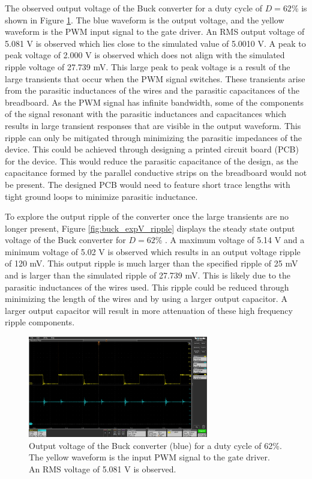 \documentclass[12pt,twoside]{scrartcl}
\begin{document}
\noindent The observed output voltage of the Buck converter for a duty cycle of $D = 62$\% is shown in Figure \ref{fig:buck_expV_newD}. The blue waveform is the output voltage, and the yellow waveform is the PWM input signal to the gate driver. An RMS output voltage of 5.081 V is observed which lies close to the simulated value of 5.0010 V. A peak to peak voltage of 2.000 V is observed which does not align with the simulated ripple voltage of 27.739 mV. This large peak to peak voltage is a result of the large transients that occur when the PWM signal switches. These transients arise from the parasitic inductances of the wires and the parasitic capacitances of the breadboard. As the PWM signal has infinite bandwidth, some of the components of the signal resonant with the parasitic inductances and capacitances which results in large transient responses that are visible in the output waveform. This ripple can only be mitigated through minimizing the parasitic impedances of the device. This could be achieved through designing a printed circuit board (PCB) for the device. This would reduce the parasitic capacitance of the design, as the capacitance formed by the parallel conductive strips on the breadboard would not be present.  The designed PCB would need to feature short trace lengths with tight ground loops to minimize parasitic inductance.\par
\vspace{5mm}
\noindent To explore the output ripple of the converter once the large transients are no longer present, Figure \ref{fig:buck_expV_ripple} displays the steady state output voltage of the Buck converter for $D = 62$\% . A maximum voltage of 5.14 V and a minimum voltage of 5.02 V is observed which results in an output voltage ripple of 120 mV. This output ripple is much larger than the specified ripple of 25 mV and is larger than the simulated ripple of 27.739 mV.  This is likely due to the parasitic inductances of the wires used. This ripple could be reduced through minimizing the length of the wires and by using a larger output capacitor. A larger output capacitor will result in more attenuation of these high frequency ripple components.\par
\newpage
\begin{figure}[htp]
    \centering
    \includegraphics[width=0.7\textwidth]{buck_expV_newD}
    \caption{Output voltage of the Buck converter (blue) for a duty cycle of 62\%. The yellow waveform is the input PWM signal to the gate driver. An RMS voltage of 5.081 V is observed.}
    \label{fig:buck_expV_newD}
\end{figure}
\end{document}
